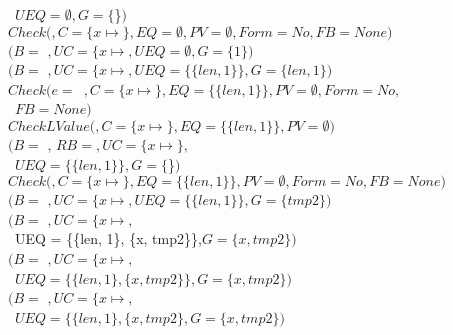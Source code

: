 \begin{small}
\begin{tabbing}
\>\>\>\>\>\>~$UEQ =  \emptyset, G = \{$\}$)$ \\
\>\>\>\>\>$Check($$,C  =\{x\mapsto$$\}, EQ = \emptyset, PV = \emptyset,
                       Form = No, FB = None)$\\
\>\>\>\>\>\>$(B = $ $, UC = \{x\mapsto$$,
                  UEQ = \emptyset, G = \{1\})$\\
\>\>\>\>\>$(B = $ $, UC = \{x\mapsto$$,
                  UEQ = \{\{len, 1\}\}, G = \{len, 1\})$\\
\>\>\>\>$Check(e=$~$, C=\{x \mapsto$$\},
          EQ=\{\{len, 1\}\},PV=\emptyset, Form = No,$\\
\>\>\>\>~$FB = None)$\\
\>\>\>\>\>$CheckLValue($$, C = \{x \mapsto$$\}, 
                                      EQ = \{\{len, 1\}\}, PV = \emptyset)$ \\
\>\>\>\>\>\>$(B = $ , $RB = $$,
                     UC = \{x \mapsto$$\},$\\
\>\>\>\>\>\>~$UEQ = \{\{len, 1\}\}, G = \{$\}$)$ \\
\>\>\>\>\>$Check($$,C  =\{x\mapsto$$\}, EQ = \{\{len, 1\}\}, PV = \emptyset,
                       Form = No, FB = None)$\\
\>\>\>\>\>\>$(B = $ $, UC = \{x\mapsto$$,
                      UEQ = \{\{len, 1\}\},G = \{tmp2\})$\\
\>\>\>\>\>$(B = $ $,
                   UC = \{x\mapsto$$,$\\
\>\>\>\>\>~UEQ = \{\{len, 1\}, \{x, tmp2\}\},$G = \{x, tmp2\})$\\
\>\>\>\>$(B = $ $, UC = \{x\mapsto$$,$\\
\>\>\>\>~$UEQ = \{\{len, 1\}, \{x, tmp2\}\}, G = \{x, tmp2\})$\\
\>\>\>$(B = $ $, UC = \{x\mapsto$$,$\\
\>\>\>~$UEQ = \{\{len, 1\}, \{x, tmp2\}, G = \{x, tmp2\})$\\ \\

\end{tabbing}
\end{small}
